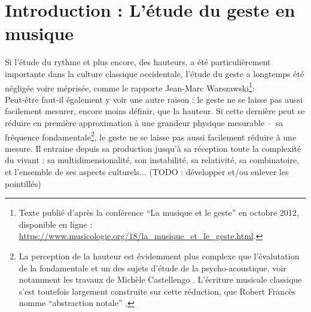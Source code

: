 \clearpage

\section{Introduction : L'étude du geste en musique}

\noindent Si l'étude du rythme et plus encore, des hauteurs, a été particulièrement importante dans la culture classique occidentale, l'étude du geste a longtemps été négligée voire méprisée, comme le rapporte Jean-Marc Warszawski\footnote{Texte publié d'après la conférence ``La musique et le geste'' en octobre 2012, disponible en ligne : \url{https://www.musicologie.org/18/la_musique_et_le_geste.html}.}: \\
\indent Peut-être faut-il également y voir une autre raison : le geste ne se laisse pas aussi facilement mesurer, encore moins définir, que la hauteur. Si cette dernière peut se  réduire en première approximation à une grandeur physique mesurable --~sa fréquence fondamentale\footnote{La perception de la hauteur est évidemment plus complexe que l'évalutation de la fondamentale et un des sujets d'étude de la psycho-acoustique, voir notamment les travaux de Michèle Castellengo \cite{castellengo_ecoute_2015}. L'écriture musicale classique s'est toutefois largement construite sur cette réduction, que Robert Francès nomme ``abstraction notale'' \cite{frances_perception_1984}.}, le geste ne se laisse pas aussi facilement réduire à une mesure. Il entraine depuis sa production jusqu'à sa réception toute la complexité du vivant : sa multidimensionalité, son instabilité, sa relativité, sa combinatoire, et l'ensemble de ses aspects culturels... (TODO : développer et/ou enlever les pointillés)\\
